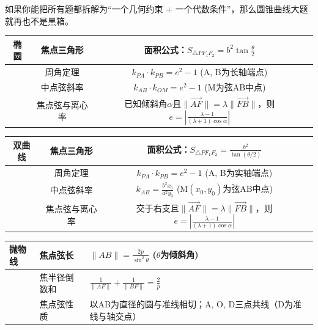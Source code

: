\documentclass{ctexart}
\begin{document}
	如果你能把所有题都拆解为``一个几何约束 + 一个代数条件''，那么圆锥曲线大题就再也不是黑箱。
	
	
	\begin{table}[ht]
		\centering
		\begin{tabular}{|c|c|c|c|}
			\hline
			\textbf{椭圆} & 焦点三角形 & 面积公式：$S_{\triangle PF_1F_2} = b^2 \tan \frac{\theta}{2}$ & \\
			\hline
			& 周角定理 & $k_{PA} \cdot k_{PB} = e^2 - 1$ (A, B为长轴端点) & \\
			\hline
			& 中点弦斜率 & $k_{AB} \cdot k_{OM} = e^2 - 1$ (M为弦AB中点) & \\
			\hline
			& 焦点弦与离心率 & 已知倾斜角$\alpha$且$\|\overrightarrow{AF}\| = \lambda \|\overrightarrow{FB}\|$，则$e=\left|\frac{\lambda-1}{(\lambda+1)\cos\alpha}\right|$ & \\
			\hline
		\end{tabular}
	\end{table}
	
	\begin{table}[ht]
		\centering
		\begin{tabular}{|c|c|c|c|}
			\hline
			\textbf{双曲线} & 焦点三角形 & 面积公式：$S_{\triangle PF_1F_2} = \frac{b^2}{\tan(\theta/2)}$ & \\
			\hline
			& 周角定理 & $k_{PA} \cdot k_{PB} = e^2 - 1$ (A, B为实轴端点) & \\
			\hline
			& 中点弦斜率 & $k_{AB} = \frac{b^2 x_0}{a^2 y_0}$ (M$(x_0,y_0)$为弦AB中点) & \\
			\hline
			& 焦点弦与离心率 & 交于右支且$\|\overrightarrow{AF}\| = \lambda \|\overrightarrow{FB}\|$，则$e=\left|\frac{\lambda-1}{(\lambda+1)\cos\alpha}\right|$ & \\
			\hline
		\end{tabular}
	\end{table}
	
		\begin{table}[ht]
			\centering
			\begin{tabular}{|p{1.5cm}|p{2.4cm}|p{8.8cm}|}
				\hline
				\textbf{抛物线} & 焦点弦长 & $\|AB\| = \frac{2p}{\sin^2 \theta}$ ($\theta$为倾斜角) \\
				\hline
				& 焦半径倒数和 & $\frac{1}{\|AF\|} + \frac{1}{\|BF\|} = \frac{2}{p}$ \\
				\hline
				& 焦点弦性质 & 以AB为直径的圆与准线相切；A, O, D三点共线（D为准线与轴交点） \\
				\hline
			\end{tabular}
		\end{table}
		
\end{document}
